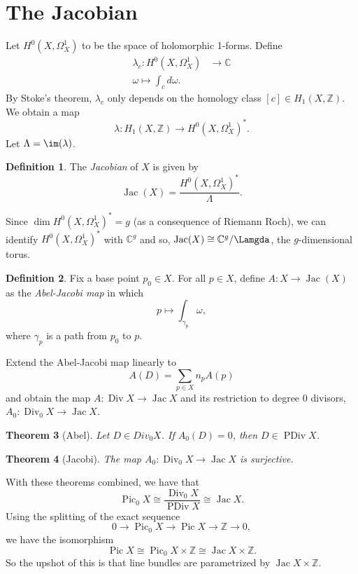 \documentclass[10pt, a4paper]{article}
\theoremstyle{plain}
\newtheorem{thrm}{Theorem}[section]
\theoremstyle{definition}
\newtheorem{defn}[thrm]{Definition}
\DeclareMathOperator{\Div}{Div}
\DeclareMathOperator{\Jac}{Jac}
\DeclareMathOperator{\Pic}{Pic}
\DeclareMathOperator{\PDiv}{PDiv}
\begin{document}
\section{The Jacobian}
Let $H^0(X, \Omega^1_X)$ to be the space of holomorphic 1-forms. Define 
\begin{align*} 
\lambda_c: H^0(X, \Omega^1_X) &\rightarrow \mathbb{C} \\
\omega \mapsto \int_c d\omega.
\end{align*}
By Stoke's theorem, $\lambda_c$ only depends on the homology class $[c] \in H_1(X, \mathbb{Z})$. We obtain a map 
$$\lambda: H_1(X, \mathbb{Z}) \rightarrow H^0(X, \Omega^1_X)^*.$$
Let $\Lambda = \im(\lambda)$. 
\begin{defn} The \emph{Jacobian} of $X$ is given by 
$$\Jac(X) = \frac{H^0(X, \Omega^1_X)^*}{\Lambda}.$$
\end{defn} 
Since $\dim H^0(X, \Omega^1_X)^* = g$ (as a consequence of Riemann Roch), we can identify $ H^0(X, \Omega^1_X)^*$ with $\mathbb{C}^g$ and so, $\Jac(X) \cong \mathbb{C}^g/\Lamgda$, the $g$-dimensional torus. 
\begin{defn} Fix a base point $p_0 \in X$. For all $p \in X$, define $A: X \rightarrow \Jac(X)$ as the \emph{Abel-Jacobi map} in which 
$$p \mapsto \int_{\gamma_p} \omega,$$
where $\gamma_p$ is a path from $p_0$ to $p$. \end{defn}
Extend the Abel-Jacobi map linearly to 
$$A(D) = \sum_{p \in X} n_p A(p)$$
and obtain the map $A: \Div X \rightarrow \Jac X$ and its restriction to degree 0 divisors, $A_0: \Div_0 X \rightarrow \Jac X$. 
\begin{thrm}[Abel]
Let $D \in Div_0 X$. If $A_0(D) = 0$, then $D \in \PDiv X$.  
\end{thrm} 
\begin{thrm}[Jacobi] The map $A_0: \Div_0 X \rightarrow \Jac X$ is surjective.
\end{thrm}
With these theorems combined, we have that
$$\Pic_0 X \cong \frac{\Div_0 X}{\PDiv X} \cong \Jac X.$$
Using the splitting of the exact sequence 
$$0 \rightarrow \Pic_0 X \rightarrow \Pic X \rightarrow \mathbb{Z} \rightarrow 0,$$
we have the isomorphism
$$\Pic X \cong \Pic_0 X \times \mathbb{Z} \cong \Jac X \times \mathbb{Z}.$$
So the upshot of this is that line bundles are parametrized by $\Jac X \times \mathbb{Z}$. 
\end{document}
